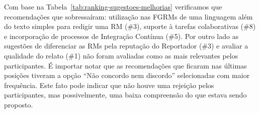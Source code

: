 \begin{table}[htpb]
\centering
{}
\caption{Pesos utilizados para ordenar as sugestões propostas.}
\label{tab:pesos_rank_sug_melhorias}
\end{table}

Com base na Tabela~\ref{tab:ranking-sugestoes-melhorias} verificamos que
recomendações que sobressaíram: utilização nas FGRMs de uma linguagem além do
texto simples para redigir uma RM (\#3), suporte à tarefas colaborativas (\#8) e
incorporação de processos de Integração Contínua (\#5). Por outro lado as
sugestões de diferenciar as RMs pela reputação do Reportador (\#3) e avaliar a
qualidade do relato (\#1) não foram avaliadas como as mais relevantes pelos
participantes. É importar notar que as recomendações que ficaram nas últimas
posições tiveram a opção ``Não concordo nem discordo'' selecionadas com maior
frequência. Este fato pode indicar que não houve uma rejeição pelos
participantes, mas possivelmente, uma baixa compreensão do que estava sendo
proposto.

\begin{table}[htpb]
\centering
{}
\caption{Ranking das sugestões propostas}
\label{tab:ranking-sugestoes-melhorias}
\end{table}


